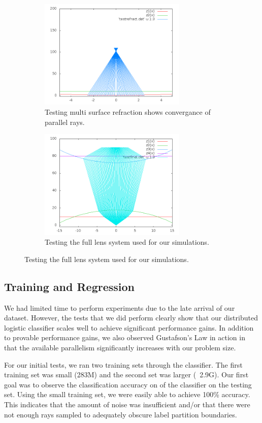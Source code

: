 \begin{figure}
\centering
\begin{subfigure}{.5\textwidth}
  \centering
  \includegraphics[width=7cm]{out4.png}
  \caption{Testing multi surface refraction shows convergance of parallel rays.}
  \label{fig:sub3}
\end{subfigure}%
\begin{subfigure}{.5\textwidth}
  \centering
  \includegraphics[width=7cm]{out5.png}
  \caption{Testing the full lens system used for our simulations.}
  \label{fig:sub4}
\end{subfigure}
\label{fig:secondtrace}
\end{figure}


\subsection{Training and Regression}

We had limited time to perform experiments due to the late arrival of our dataset.  However, the tests that we did perform clearly show that our distributed logistic classifier scales well to achieve significant performance gains.  In addition to provable performance gains, we also observed Gustafson's Law in action in that the available parallelism significantly increases with our problem size.

For our initial tests, we ran two training sets through the classifier.  The first training set was small (283M) and the second set was larger (~2.9G).  Our first goal was to observe the classification accuracy on of the classifier on the testing set.  Using the small training set, we were easily able to achieve 100\% accuracy.  This indicates that the amount of noise was insufficient and/or that there were not enough rays sampled to adequately obscure label partition boundaries.

